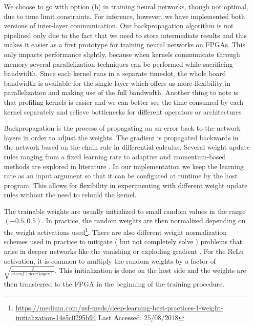 We choose to go with option (b) in training neural networks, though not optimal, due to time limit constraints. For inference, however, we have implemented both versions of inter-layer communication. Our backpropagation algorithm is not pipelined only due to the fact that we need to store intermediate results and this makes it easier as a first prototype for training neural networks on FPGAs. This only impacts performance slightly, because when kernels communicate through memory several parallelization techniques can be performed while sacrificing bandwidth. Since each kernel runs in a separate timeslot, the whole board bandwidth is available for the single layer which offers us more flexibility in parallelization and making use of the full bandwidth. Another thing to note is that profiling kernels is easier and we can better see the time consumed by each kernel separately and relieve bottlenecks for different operators or architectures 

Backpropagation is the process of propagating an an error back to the network layers in order to adjust the weights. The gradient is propagated backwards in the network based on the chain rule in differential calculus. Several weight update rules ranging from a fixed learning rate to adaptive and momentum-based methods are explored in literature \cite{ddl}. In our implementation we keep the learning rate as an input argument so that it can be configured at runtime by the host program. This allows for flexibility in experimenting with different weight update rules without the need to rebuild the kernel.

The trainable weights are usually initialized to small random values in the range $ (-0.5,0.5) $. In practice, the random weights are then normalized depending on the weight activations used\footnote{\url{https://medium.com/usf-msds/deep-learning-best-practices-1-weight-initialization-14e5c0295b94} Last Accessed: 25/08/2018}. There are also different weight normalization schemes used in practice to mitigate ( but not completely solve ) problems that arise in deeper networks like the vanishing or exploding gradient \cite{hochreiter1998vanishing}. For the ReLu activation, it is common to multiply the random weights by a factor of $ \sqrt{\frac{2}{sizeof(prev. layer)}} $. This initialization is done on the host side and the weights are then transferred to the FPGA in the beginning of the training procedure. 


